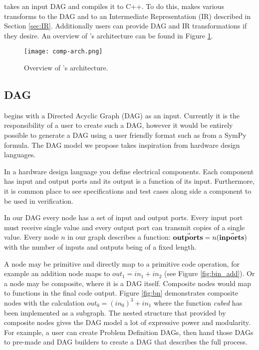 \phlat takes an input DAG and compiles it to C++.
To do this, \phlat makes various transforms to the DAG and to an Intermediate Representation (IR) described in Section \ref{sec:IR}.
Additionally users can provide DAG and IR transformations if they desire.
An overview of \phlat{}'s architecture can be found in Figure \ref{fig:arch}.

\begin{figure}[h!]
    \begin{center}
        \texttt{[image: comp-arch.png]}
        \caption{Overview of \phlat{}'s architecture.}
        \label{fig:arch}
    \end{center}
\end{figure}



\subsection{DAG} \label{sec:DAG}

\phlat begins with a Directed Acyclic Graph (DAG) as an input.
Currently it is the responsibility of a user to create such a DAG, however it would be entirely possible to generate a DAG using a user friendly format such as from a SymPy \cite{sympy} formula.
The DAG model we propose takes inspiration from hardware design languages.

In a hardware design language you define electrical components.
Each component has input and output ports and its output is a function of its input.
Furthermore, it is common place to see specifications and test cases along side a component to be used in verification.

In our DAG every node has a set of input and output ports.
Every input port must receive single value and every output port can transmit copies of a single value.
Every node $n$ in our graph describes a function: $\vec{\mathbf{out ports}}=n(\vec{\mathbf{in ports}})$ with the number of inputs and outputs being of a fixed length.

A node may be primitive and directly map to a primitive code operation, for example an addition node maps to $out_1 = in_1 + in_2$ (see Figure \ref{fig:bin_add}).
Or a node may be composite, where it is a DAG itself.
Composite nodes would map to functions in the final code output.
Figure \ref{fig:bn} demonstrates composite nodes with the calculation $out_0 = (in_0)^3 + in_1$ where the function \textit{cubed} has been implemented as a subgraph.
The nested structure that provided by composite nodes gives the DAG model a lot of expressive power and modularity.
For example, a user can create Problem Definition DAGs, then hand those DAGs to pre-made  and  DAG builders to create a DAG that describes the full  process.


